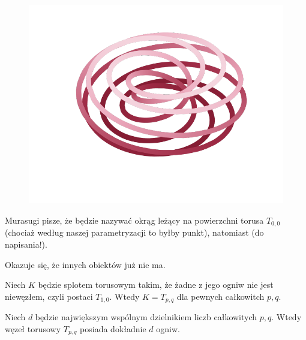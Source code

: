 \begin{figure}[H]
\begin{minipage}[b]{.3\linewidth}
        \includegraphics[width=\linewidth]{../data/torus-p8-q3.pdf}
    \end{minipage}
\end{figure}

Murasugi \cite[s. 135]{murasugi1996} pisze, że będzie nazywać okrąg leżący na powierzchni torusa $T_{0, 0}$ (chociaż według naszej parametryzacji to byłby punkt), natomiast (do napisania!).



Okazuje się, że innych obiektów już nie ma.

\begin{proposition}
    Niech $K$ będzie splotem torusowym takim, że żadne z jego ogniw nie jest niewęzłem, czyli postaci $T_{1, 0}$.
    Wtedy $K = T_{p, q}$ dla pewnych całkowitch $p, q$.
\end{proposition}

\begin{proposition}
    Niech $d$ będzie największym wspólnym dzielnikiem liczb całkowitych $p, q$.
    Wtedy węzeł torusowy $T_{p, q}$ posiada dokładnie $d$ ogniw.
\end{proposition}

